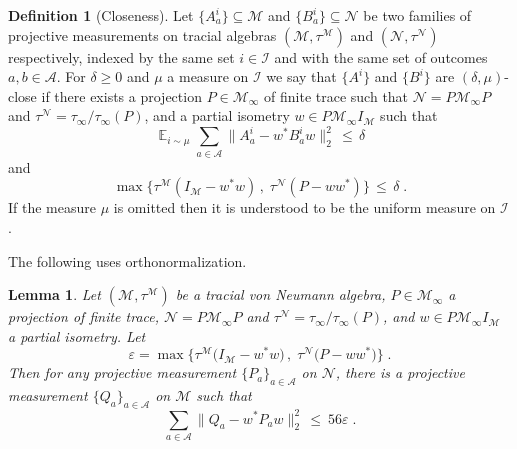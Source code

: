 \documentclass[11pt]{article}
\newtheorem{lemma}[theorem]{Lemma}
\theoremstyle{definition}
\newtheorem{definition}[theorem]{Definition}
\newcommand{\Id}{\ensuremath{I}}
\DeclareMathOperator*{\Expectation}{\mathbb{E}}
\newcommand{\Es}[1]{\Expectation_{#1}}
\newcommand{\mA}{\ensuremath{\mathcal{A}}}
\newcommand{\mM}{\ensuremath{\mathcal{M}}}
\newcommand{\mI}{\ensuremath{\mathcal{I}}}
\newcommand{\eps}{\varepsilon}
\newcommand{\mN}{\mathcal{N}}
\begin{document}
	\begin{definition}[Closeness]\label{def:close}
Let $\{A^i_a\}\subseteq \mM$ and $\{B^i_a\}\subseteq \mN$ be two families of projective measurements on  tracial algebras $(\mM,\tau^\mM)$ and $(\mN,\tau^\mN)$ respectively, indexed by the same set $i\in \mI$ and with the same set of outcomes $a,b\in\mA$. For $\delta\geq0$ and $\mu$ a measure on $\mI$ we say that $\{A^i\}$ and $\{B^i\}$ are $(\delta,\mu)$-close if there exists a projection $P\in\mM_\infty$ of finite trace such that $\mN=P\mM_\infty P$ and $\tau^\mN=\tau_\infty/\tau_\infty(P)$, and a partial isometry $w\in P \mM_\infty \Id_\mM$ such that 
\[ \Es{i\sim\mu} \sum_{a\in\mA} \big\| A^i_a - w^* B^i_a w \big\|_2^2 \,\leq\,\delta\]
and 
\[\max\big\{ \tau^\mM(\Id_\mM-w^*w)\,,\; \tau^\mN(P-ww^*)\big\} \,\leq\, \delta\;.\]
If the measure $\mu$ is omitted then it is understood to be the uniform measure on $\mI$.
\end{definition}
	
The following uses orthonormalization. 
	
\begin{lemma}\label{lem:pull-back}
Let  $(\mM,\tau^\mM)$ be a tracial von Neumann algebra, $P\in\mM_\infty$ a projection of finite trace, $\mN=P\mM_\infty P$ and $\tau^\mN=\tau_\infty/\tau_\infty(P)$, and $w\in P \mM_\infty \Id_\mM$ a partial isometry. Let 
\[ \eps = \max\big\{ \tau^\mM\big(\Id_\mM - w^* w\big)\,,\;\tau^\mN\big( P- w w^*\big)\big\}\;.\] 
 Then for any projective measurement $\{P_a\}_{a \in \mA}$ on $\mN$, there is a projective measurement $\{Q_a\}_{a \in \mA}$ on $\mM$ such that 
\begin{equation}
\label{eq:pull-back} \sum_{a \in \mA} \big\| Q_a - w^* P_a w\big\|_2^2 \,\leq \ 56\eps\;.
\end{equation}
\end{lemma}	
\end{document}
